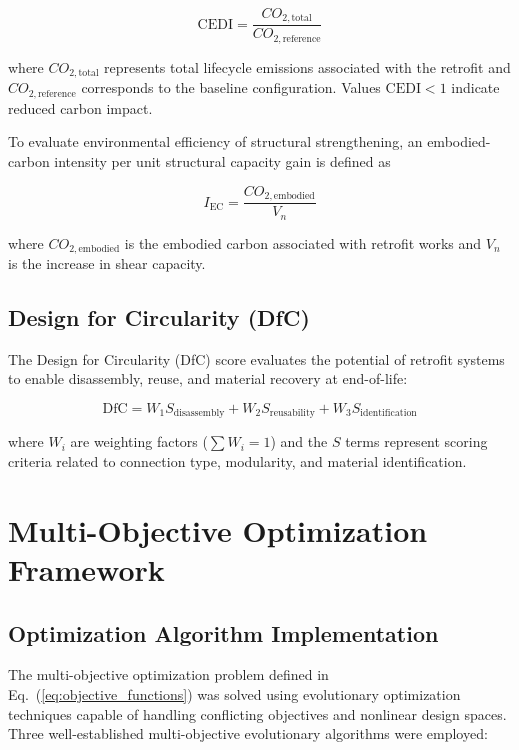 \documentclass[fleqn,10pt]{wlscirep}
\begin{document}
\begin{equation}
\mathrm{CEDI} =
\frac{CO_{2,\mathrm{total}}}{CO_{2,\mathrm{reference}}}
\end{equation}

where $CO_{2,\mathrm{total}}$ represents total lifecycle emissions associated with the retrofit and $CO_{2,\mathrm{reference}}$ corresponds to the baseline configuration. Values $\mathrm{CEDI}<1$ indicate reduced carbon impact.

To evaluate environmental efficiency of structural strengthening, an embodied-carbon intensity per unit structural capacity gain is defined as

\begin{equation}
I_{\mathrm{EC}} =
\frac{CO_{2,\mathrm{embodied}}}{V_n}
\end{equation}

where $CO_{2,\mathrm{embodied}}$ is the embodied carbon associated with retrofit works and $V_n$ is the increase in shear capacity.

\subsection{Design for Circularity (DfC)}

The Design for Circularity (DfC) score evaluates the potential of retrofit systems to enable disassembly, reuse, and material recovery at end-of-life:

\begin{equation}
\mathrm{DfC} =
W_1 S_{\mathrm{disassembly}}
+
W_2 S_{\mathrm{reusability}}
+
W_3 S_{\mathrm{identification}}
\end{equation}

where $W_i$ are weighting factors ($\sum W_i = 1$) and the $S$ terms represent scoring criteria related to connection type, modularity, and material identification.

\section{Multi-Objective Optimization Framework}
\label{sec:MOO}
\subsection{Optimization Algorithm Implementation}
\label{sec:optimization}

The multi-objective optimization problem defined in Eq.~(\ref{eq:objective_functions})
was solved using evolutionary optimization techniques capable of handling
conflicting objectives and nonlinear design spaces. Three well-established
multi-objective evolutionary algorithms were employed:
\end{document}
